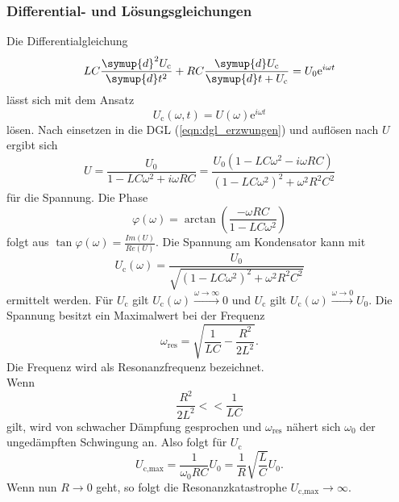 \subsubsection{Differential- und Lösungsgleichungen}
Die Differentialgleichung
\begin{equation}
    LC \frac{\symup{d}^2U_\text{c}}{\symup{d}t^2} + RC \frac{\symup{d}U_\text{c}}{\symup{d}t + U_\text{c}} = U_0 \mathrm{e}^{i\omega t}
    \label{eqn:dgl_erzwungen}
\end{equation}
lässt sich mit dem Ansatz
\begin{equation*}
    U_\text{c}(\omega,t) = U(\omega) \mathrm{e}^{i\omega t}
\end{equation*}
lösen. Nach einsetzen in die DGL (\autoref{eqn:dgl_erzwungen}) und auflösen nach $U$ ergibt sich
\begin{equation}
    U = \frac{U_0}{1 - LC \omega^2 + i\omega RC} = \frac{U_0 (1-LC \omega^2 - i\omega RC)}{(1-LC\omega^2)^2 + \omega^2 R^2 C^2}
\end{equation}
für die Spannung.
Die Phase
\begin{equation}
    \varphi(\omega) = \arctan \left( \frac{-\omega RC}{1-LC\omega^2} \right)
\end{equation}
folgt aus $\tan \varphi(\omega) = \frac{Im(U)}{Re(U)}$.
Die Spannung am Kondensator kann mit
\begin{equation}
    U_\text{c}(\omega) = \frac{U_0}{\sqrt{\left( 1 - LC\omega^2 \right)^2 + \omega^2R^2C^2}}
    \label{eqn:spannung_c}
\end{equation}
ermittelt werden. Für $U_\text{c}$ gilt $U_\text{c}(\omega)\xrightarrow{\omega\to\infty}0$ und $U_\text{c}$ gilt $U_\text{c}(\omega)\xrightarrow{\omega\to 0}U_0$.
Die Spannung besitzt ein Maximalwert bei der Frequenz
\begin{equation}
    \omega_\text{res} = \sqrt{\frac{1}{LC} - \frac{R^2}{2L^2}} .
\end{equation}
Die Frequenz wird als Resonanzfrequenz bezeichnet.\\
Wenn
\begin{equation*}
    \frac{R^2}{2L^2} << \frac{1}{LC}
\end{equation*}
gilt, wird von schwacher Dämpfung gesprochen und $\omega_\text{res}$ nähert sich $\omega_0$ der ungedämpften Schwingung an.
Also folgt für $U_\text{c}$
\begin{equation}
    U_\text{c,max} = \frac{1}{\omega_0 RC} U_0 = \frac{1}{R} \sqrt{\frac{L}{C}}U_0 .
\end{equation}
Wenn nun $R \rightarrow 0$ geht, so folgt die Resonanzkatastrophe $U_\text{c,max} \rightarrow \infty$.
